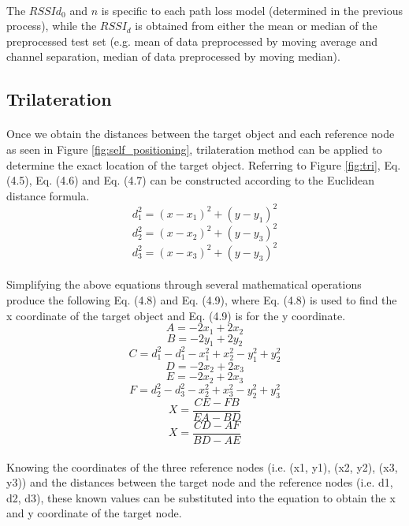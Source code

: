 \paragraph{}The $RSSId_0$ and $n$ is specific to each path loss model (determined in the previous process), while the $RSSI_d$ is obtained from either the mean or median of the preprocessed test set (e.g. mean of data preprocessed by moving average and channel separation, median of data preprocessed by moving median).
\subsection{Trilateration}
\paragraph{}Once we obtain the distances between the target object and each reference node as seen in Figure \ref{fig:self_positioning}, trilateration method can be applied to determine the exact location of the target object. Referring to Figure \ref{fig:tri}, Eq. (4.5), Eq. (4.6) and Eq. (4.7) can be constructed according to the Euclidean distance formula.
\begin{equation}
d_1^2 = (x-x_1)^2+(y - y_1)^2
\end{equation}
\begin{equation}
d_2^2 = (x-x_2)^2+(y - y_3)^2
\end{equation}
\begin{equation}
d_3^2 = (x-x_3)^2+(y - y_3)^2
\end{equation}
\paragraph{}Simplifying the above equations through several mathematical operations produce the following Eq. (4.8) and Eq. (4.9), where Eq. (4.8) is used to find the x coordinate of the target object and Eq. (4.9) is for the y coordinate.
\begin{equation*}
A = -2x_1+ 2x_2
\end{equation*}
\begin{equation*}
B= -2y_1+ 2y_2
\end{equation*}
\begin{equation*}
C = d_1^2- d_1^2-x_1^2+x_2^2-y_1^2+y_2^2
\end{equation*}
\begin{equation*}
D = -2x_2+ 2x_3
\end{equation*}
\begin{equation*}
E = -2x_2+ 2x_3
\end{equation*}
\begin{equation*}
F = d_2^2- d_3^2-x_2^2+x_3^2-y_2^2+y_3^2
\end{equation*}
\begin{equation}
X = \frac{CE-FB}{EA-BD}
\end{equation}
\begin{equation}
X = \frac{CD-AF}{BD-AE}
\end{equation}
\paragraph{}Knowing the coordinates of the three reference nodes (i.e. (x1, y1), (x2, y2), (x3, y3)) and the distances between the target node and the reference nodes (i.e. d1, d2, d3), these known values can be substituted into the equation to obtain the x and y coordinate of the target node.



